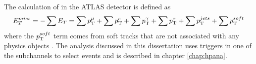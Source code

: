 	The calculation of \Etm in the ATLAS detector is defined as
	\begin{equation}\label{eqn:etmiss}
	E_{T}^{miss} = - \sum E_{T} = \sum p_{\text{T}}^{\mu} + \sum p_{\text{T}}^{e} + \sum p_{\text{T}}^{\gamma} + \sum p_{\text{T}}^{\tau} + \sum p_{\text{T}}^{jets} + \sum p_{\text{T}}^{soft}
	\end{equation}
	where the $p_{\text{T}}^{soft}$ term comes from soft tracks that are not associated with any physics objects \cite{met-perf}. The analysis discussed in this dissertation uses \Etm triggers in one of the subchannels to select events and is described in chapter \ref{chap:hpana}.